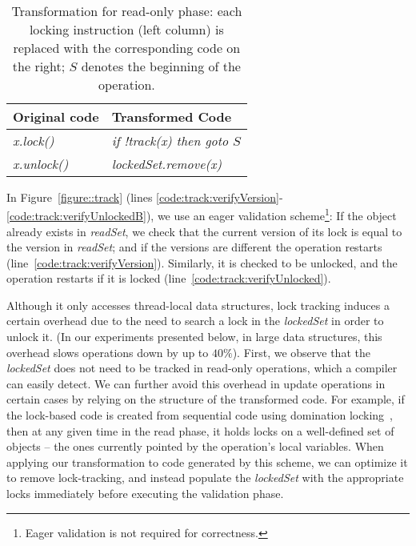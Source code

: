 \begin{table}
\codesize
\ttfamily
{\tt
\begin{center}
\begin{tabular}{|l|l|}
\hline
\textbf{Original code} & \textbf{Transformed Code}\\
\hline
\textit{x.lock()}&
\textit{if !track(x) then goto $S$}
\\
\hline
\textit{x.unlock()}&
\textit{lockedSet.remove(x)}
\\
\hline
\end{tabular}
\end{center}
}
\caption{Transformation for read-only phase:
each locking instruction (left column) is replaced with the corresponding code on the right;
 $S$  denotes the beginning of the operation.
}
\label{Ta:readOnlyTransformation}
\end{table}

In Figure~\ref{figure::track} (lines \ref{code:track:verifyVersion}-\ref{code:track:verifyUnlockedB}), we use an eager validation scheme\footnote{Eager validation is not required for correctness.}: 
If the object already exists in \emph{readSet}, we check that the current version of its lock is equal
to the version in \emph{readSet}; and if the versions are different  the operation restarts (line~\ref{code:track:verifyVersion}).
Similarly, it is  checked to be unlocked, and the operation restarts if it is locked (line~\ref{code:track:verifyUnlocked}).


Although it only accesses thread-local data structures, lock tracking induces a certain overhead due to the need to search a lock in the \emph{lockedSet} in order to unlock it. (In our experiments presented below, in large data structures, this overhead slows operations down by up to $40\%$).
First, we observe that 
the \emph{lockedSet} does not need to be tracked in read-only operations, which a compiler can easily detect. 
 We can further avoid this overhead in update operations in certain 
 cases by relying on the structure of the transformed code. For example, if the lock-based code is created from sequential code 
using domination locking~\cite{Gueta2011}, then at any given time in the read phase, it holds locks on a well-defined set of objects -- the ones currently pointed by the operation's local variables. When applying our transformation to code generated by this scheme, we can optimize it to remove lock-tracking, and instead populate the \emph{lockedSet} with the appropriate locks immediately before executing the validation phase.

